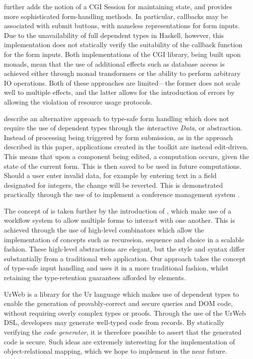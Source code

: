\documentclass[preprint]{sigplanconf}
\begin{document}
\citet{thiemann:wash} further adds the notion of a CGI Session for maintaining state, and provides more sophisticated form-handling methods. In particular, callbacks may be associated with submit buttons, with nameless representations for form inputs. Due to the unavailability of full dependent types in Haskell, however, this implementation does not statically verify the suitability of the callback function for the form inputs. Both implementations of the CGI library, being built upon monads, mean that the use of additional effects such as database access is achieved either through monad transformers or the ability to perform arbitrary IO operations. Both of these approaches are limited---the former does not scale well to multiple effects, and the latter allows for the introduction of errors by allowing the violation of resource usage protocols.

\citet{plasmeijer:idata} describe an alternative approach to type-safe form handling which does not require the use of dependent types through the \textit{i}nteractive \textit{Data}, or \idata{} abstraction. Instead of processing being triggered by form submission, as in the approach described in this paper, applications created in the \idata{} toolkit are instead edit-driven. This means that upon a component being edited, a computation occurs, given the state of the current form. This is then saved to be used in future computations. Should a user enter invalid data, for example by entering text in a field designated for integers, the change will be reverted. This is demonstrated practically through the use of \idata{} to implement a conference management system \cite{plasmeijer:cms}.

The concept of \idata{} is taken further by the introduction of \itasks{} \cite{plasmeijer:itasks}, which make use of a workflow system to allow multiple \idata{} forms to interact with one another. This is achieved through the use of high-level combinators which allow the implementation of concepts such as recurseion, sequence and choice in a scalable fashion. These high-level abstractions are elegant, but the style and syntax differ substantially from a traditional web application. Our approach takes the concept of type-safe input handling and uses it in a more traditional fashion, whilst retaining the type-retention guarantees afforded by \idata{} elements.

Ur\/Web \cite{urweb} is a library for the Ur language which makes use of dependent types to enable the generation of provably-correct and secure queries and DOM code, without requiring overly complex types or proofs. Through the use of the Ur\/Web DSL, developers may generate well-typed code from records. By statically verifying the \textit{code generator}, it is therefore possible to assert that the generated code is secure. Such ideas are extremely interesting for the implementation of object-relational mapping, which we hope to implement in the near future.
\end{document}
